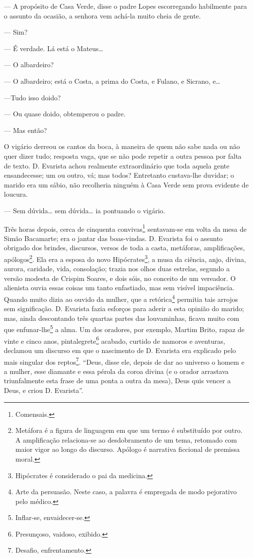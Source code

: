 --- A propósito de Casa Verde, disse o padre Lopes escorregando
habilmente para o assunto da ocasião, a senhora vem achá-la muito cheia
de gente.

--- Sim?

--- É verdade. Lá está o Mateus\ldots{}

--- O albardeiro?

--- O albardeiro; está o Costa, a prima do Costa, e Fulano, e Sicrano,
e\ldots{}

---Tudo isso doido?

--- Ou quase doido, obtemperou o padre.

--- Mas então?

O vigário derreou os cantos da boca, à maneira de quem não sabe nada ou
não quer dizer tudo; resposta vaga, que se não pode repetir a outra
pessoa por falta de texto. D. Evarista achou realmente extraordinário
que toda aquela gente ensandecesse; um ou outro, vá; mas todos?
Entretanto custava-lhe duvidar; o marido era um sábio, não recolheria
ninguém à Casa Verde sem prova evidente de loucura.

--- Sem dúvida\ldots{} sem dúvida\ldots{} ia pontuando o vigário.

Três horas depois, cerca de cinquenta convivas\footnote{Comensais.}
sentavam-se em volta da mesa de Simão Bacamarte; era o jantar das
boas-vindas. D. Evarista foi o assunto obrigado dos brindes, discursos,
versos de toda a casta, metáforas, amplificações, apólogos\footnote{Metáfora
  é a figura de linguagem em que um termo é substituído por outro. A
  amplificação relaciona-se ao desdobramento de um tema, retomado com
  maior vigor ao longo do discurso. Apólogo é narrativa ficcional de
  premissa moral.}. Ela era a esposa do novo Hipócrates\footnote{Hipócrates
  é considerado o pai da medicina.}, a musa da ciência, anjo, divina,
aurora, caridade, vida, consolação; trazia nos olhos duas estrelas,
segundo a versão modesta de Crispim Soares, e dois sóis, no conceito de
um vereador. O alienista ouvia essas coisas um tanto enfastiado, mas sem
visível impaciência. Quando muito dizia ao ouvido da mulher, que a
retórica\footnote{Arte da persuasão. Neste caso, a palavra é empregada
  de modo pejorativo pelo médico.} permitia tais arrojos sem
significação. D. Evarista fazia esforços para aderir a esta opinião do
marido; mas, ainda descontando três quartas partes das louvaminhas,
ficava muito com que enfunar-lhe\footnote{Inflar-se, envaidecer-se.} a
alma. Um dos oradores, por exemplo, Martim Brito, rapaz de vinte e cinco
anos, pintalegrete\footnote{Presunçoso, vaidoso, exibido.} acabado,
curtido de namoros e aventuras, declamou um discurso em que o nascimento
de D. Evarista era explicado pelo mais singular dos reptos\footnote{Desafio,
  enfrentamento.}. ``Deus, disse ele, depois de dar ao universo o homem
e a mulher, esse diamante e essa pérola da coroa divina (e o orador
arrastava triunfalmente esta frase de uma ponta a outra da mesa), Deus
quis vencer a Deus, e criou D. Evarista''.

